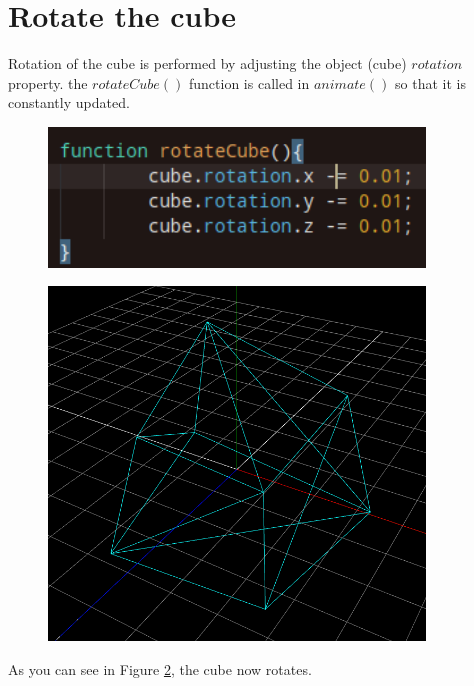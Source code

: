 \documentclass[12pt]{article}
\begin{document}
\section{Rotate the cube}
Rotation of the cube is performed by adjusting the object (cube) $rotation$ property. the $rotateCube()$ function is called in $animate()$ so that it is constantly updated.
\begin{figure}[H]  
    \centering
    \includegraphics[width=10cm]{3.png}
    \label{fig:3}
    \caption{}
\end{figure}
\begin{figure}[H]  
    \centering
    \includegraphics[width=10cm]{4.png}
    \caption{}
    \label{fig:4}
\end{figure}
As you can see in Figure \ref{fig:4}, the cube now rotates.
\end{document}
